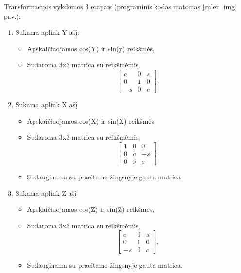 \documentclass{VUMIFInfBakalaurinis}
\begin{document}
Transformacijos vykdomos 3 etapais (programinis kodas matomas \ref{euler_img} pav.):
\begin{enumerate}[itemsep=0.5pt]
  \item Sukama aplink Y ašį:
  \begin{itemize}[itemsep=0.5pt]
    \item Apskaičiuojamos cos(Y) ir sin(y) reikšmės,
    \item Sudaroma 3x3 matrica su reikšmėmis,
    \begin{equation}
      \begin{bmatrix}
        c & 0 & s \\
        0 & 1 & 0 \\
        -s & 0 & c
      \end{bmatrix}
      .
    \end{equation}
  \end{itemize}
  \item Sukama aplink X ašį
  \begin{itemize}[itemsep=0.5pt]
    \item Apskaičiuojamos cos(X) ir sin(X) reikšmės,
    \item Sudaroma 3x3 matrica su reikšmėmis,
    \begin{equation}
      \begin{bmatrix}
        1 & 0 & 0 \\
        0 & c & -s \\
        0 & s & c
      \end{bmatrix}
      .
    \end{equation}
    \item Sudauginama su praeitame žingsnyje gauta matrica
  \end{itemize}
  \item Sukama aplink Z ašį
  \begin{itemize}[itemsep=0.5pt]
    \item Apskaičiuojamos cos(Z) ir sin(Z) reikšmės,
    \item Sudaroma 3x3 matrica su reikšmėmis, 
    \begin{equation}
      \begin{bmatrix}
        c & 0 & s \\
        0 & 1 & 0 \\
        -s & 0 & c
      \end{bmatrix}
      ,
    \end{equation}
    \item Sudauginama su praeitame žingsnyje gauta matrica.
  \end{itemize}
\end{enumerate}
\end{document}
